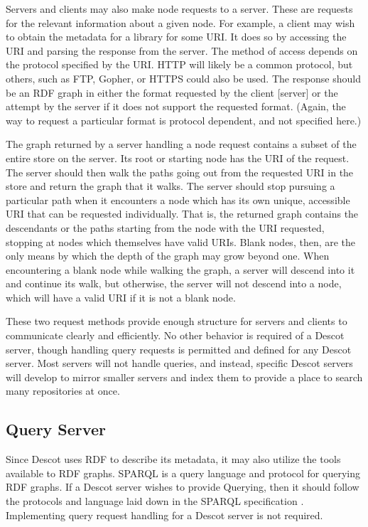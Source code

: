 \documentclass[9pt,cm,twocolumn,preprint]{sigplanconf}
\begin{document}
Servers and clients may also make node requests to a server. 
These are requests for the relevant information about a given 
node. For example, a client may wish to obtain the metadata for 
a library for some URI. It does so by accessing the URI and parsing the 
response from the server. The method of access depends on the 
protocol specified by the URI. HTTP will likely be a common 
protocol, but others, such as FTP, Gopher, or HTTPS could also 
be used. The response should be an RDF graph in either the format 
requested by the client [server] or the attempt by the server if 
it does not support the requested format. (Again, the way to 
request a particular format is protocol dependent, and not specified 
here.) 

The graph returned by a server handling a node request contains a 
subset of the entire store on the server. Its root or starting 
node has the URI of the request. The server should then walk the paths 
going out from the requested URI in the store and return the 
graph that it walks. The server should stop pursuing a particular
path when it encounters a node which has its own unique, accessible 
URI that can be requested individually. That is, the returned graph 
contains the descendants or the paths starting from the node with the 
URI requested, stopping at nodes which themselves have valid URIs. 
Blank nodes, then, are the only means by which the depth of the 
graph may grow beyond one. When encountering a blank node while 
walking the graph, a server will descend into it and continue its 
walk, but otherwise, the server will not descend into a node, which 
will have a valid URI if it is not a blank node. 

These two request methods provide enough 
structure for servers and clients to communicate clearly and 
efficiently. No other behavior is required of a Descot server, 
though handling query requests is permitted and defined for 
any Descot server. Most servers will 
not handle queries, and instead, specific Descot servers will 
develop to mirror smaller servers and index them to provide a 
place to search many repositories at once. 

\subsection{Query Server}
\label{query_server}
Since Descot uses RDF to describe its metadata, it may also utilize 
the tools available to RDF graphs. SPARQL is a query language and 
protocol for querying RDF graphs. If a Descot server wishes to 
provide Querying, then it should follow the protocols and language 
laid down in the SPARQL specification 
\cite{sparql_lang,sparql_proto,sparql_results}. 
Implementing query request handling for a Descot server is not required. 
\end{document}

